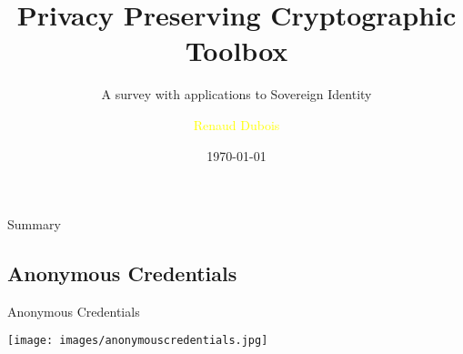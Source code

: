 \documentclass[aspectratio=43]{beamer}
\title{Privacy Preserving Cryptographic Toolbox } %
\subtitle{A survey with applications to Sovereign Identity}
\author[R. Dubois]{\textcolor{yellow}{Renaud Dubois}}
\institute[LIT]{
    \textcolor{white}{Ledger}%
    \\%
    \textcolor{white}{Innovation Team}%
} %
\date{\today}
\begin{document}
    
    \frame{\titlepage}
    \begin{frame}{Summary}
    
        \tableofcontents
        
   
    \end{frame} 
    
    
    \subsection{Anonymous Credentials}
  \begin{frame}{Anonymous Credentials}
  
  \begin{center}
  \texttt{[image: images/anonymouscredentials.jpg]}
  \end{center}

  \end{frame}
\end{document}
